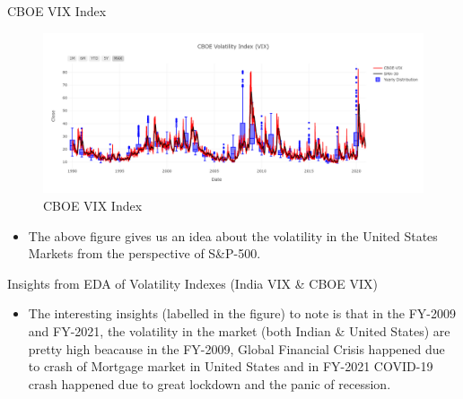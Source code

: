 \documentclass{beamer}
\begin{document}
\begin{frame}{CBOE VIX Index}
	\begin{figure}
		\centering
		\includegraphics[width = \textwidth]{images/CBOE-VIX}
		\caption{CBOE VIX Index}
		\label{fig:my_label}
	\end{figure}
	\begin{itemize}
		\item The above figure gives us an idea about the volatility in the United States Markets from the perspective of S\&P-500.
	\end{itemize}
\end{frame}

\begin{frame}{Insights from EDA of Volatility Indexes (India VIX \& CBOE VIX)}
	\begin{itemize}
		\item The interesting insights (labelled in the figure) to note is that in the FY-2009 and FY-2021, the volatility in the market (both Indian \& United States) are pretty high beacause in the FY-2009, Global Financial Crisis happened due to crash of Mortgage market in United States and in FY-2021 COVID-19 crash happened due to great lockdown and the panic of recession.
	\end{itemize}
\end{frame}

\end{document}
